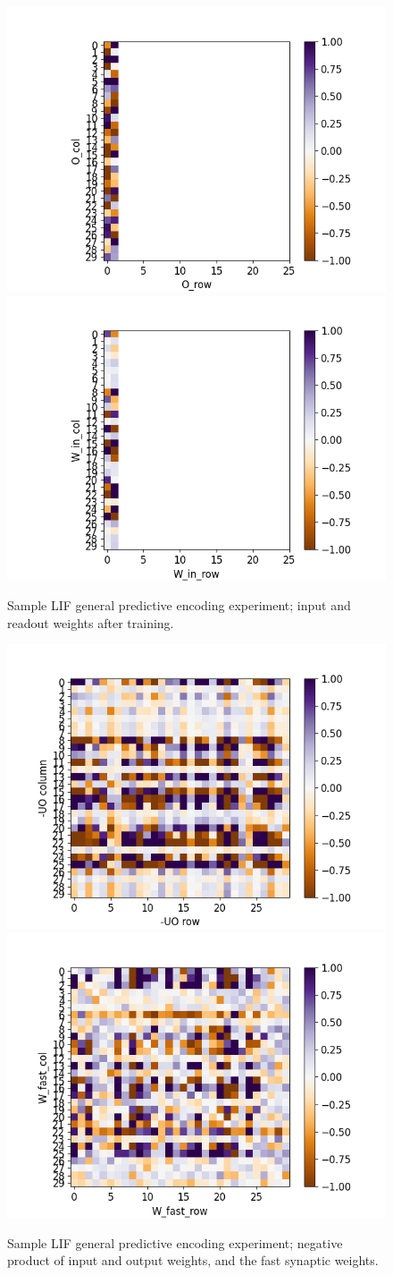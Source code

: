 \documentclass[mphil,deptreport,ianc]{infthesis} %
\begin{document}
\begin{figure}[!h]
    \centering
    \includegraphics[width=0.49\columnwidth]{figures/Supplementary/gating/LIF/GeneralPredictiveEncoding/01-04_16-46-28-427/test_heatmap_2_O_T.png}
    \includegraphics[width=0.49\columnwidth]{figures/Supplementary/gating/LIF/GeneralPredictiveEncoding/01-04_16-46-28-427/test_heatmap_2_W_in.png}
    \caption{Sample LIF general predictive encoding experiment; input and readout weights after training.}
    \label{fig:LIF_GPE_1_O_W_in}
\end{figure}

\begin{figure}[!h]
    \centering
    \includegraphics[width=0.49\columnwidth]{figures/Supplementary/gating/LIF/GeneralPredictiveEncoding/01-04_16-46-28-427/test_heatmap_compare_minUO.png}
    \includegraphics[width=0.49\columnwidth]{figures/Supplementary/gating/LIF/GeneralPredictiveEncoding/01-04_16-46-28-427/test_heatmap_compare_W_fast.png}
    \caption{Sample LIF general predictive encoding experiment; negative product of input and output weights, and the fast synaptic weights.}
    \label{fig:LIF_GPE_1_neg_UO_W_fast}
\end{figure}
\end{document}
